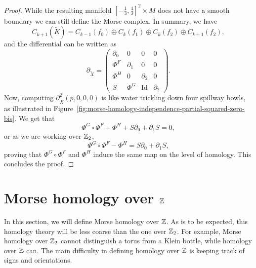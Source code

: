 \begin{proof}
While the resulting manifold $[-\frac{1}{3}, \frac{4}{3}]^2 \times M$ does not have a smooth boundary we can still define the Morse complex.
In summary, we have
\[
    C_{k+1}(\tilde{K}) = C_{k-1}(f_0) \oplus C_k(f_1) \oplus C_k(f_2) \oplus C_{k+1}(f_2)
,\] 
and the differential can be written as
\[
\partial_{\tilde{X}} = \begin{pmatrix}
    \partial_0 & 0 & 0 & 0\\
    \Phi^{F} &\partial_1 & 0 & 0 \\
    \Phi^{H} & 0 & \partial_2 & 0 \\
    S & \Phi^{G} & \operatorname{Id} & \partial_2
\end{pmatrix}
.\] 
Now, computing $\partial_{\tilde{X}}^2(p, 0, 0, 0)$ is like water trickling down four spillway bowls, as illustrated in Figure~\ref{fig:morse-homology-independence-partial-squared-zero-bis}. We get that
\[
\Phi^{G}  \circ  \Phi^{F} + \Phi^{H} + S \partial_0 + \partial_1 S = 0
,\] 
or as we are working over $\mathbb{Z}_2$,
\[
    \Phi^{G}  \circ \Phi^{F} - \Phi^{H} = S \partial_0 + \partial_1 S
,\] 
proving that $\Phi^{G}  \circ \Phi^{F}$ and $\Phi^{H}$ induce the same map on the level of homology.
This concludes the proof.
\end{proof}

\begin{figure*}
    \centering
    \vspace*{2cm}
\end{figure*}


\filbreak
\section{Morse homology over $\mathbb{Z}$}
In this section, we will define Morse homology over $\mathbb{Z}$.
As is to be expected, this homology theory will be less coarse than the one over $\mathbb{Z}_2$. For example, Morse homology over $\mathbb{Z}_2$ cannot distinguish a torus from a Klein bottle, while homology over $\mathbb{Z}$ can.
The main difficulty in defining homology over $\mathbb{Z}$ is keeping track of signs and orientations.

